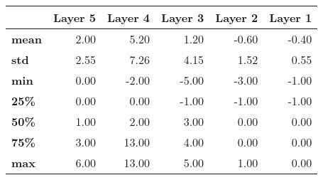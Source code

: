 \begin{tabular}{lrrrrr}
\toprule
{} &  Layer 5 &  Layer 4 &  Layer 3 &  Layer 2 &  Layer 1 \\
\midrule
\textbf{mean} &     2.00 &     5.20 &     1.20 &    -0.60 &    -0.40 \\
\textbf{std } &     2.55 &     7.26 &     4.15 &     1.52 &     0.55 \\
\textbf{min } &     0.00 &    -2.00 &    -5.00 &    -3.00 &    -1.00 \\
\textbf{25\% } &     0.00 &     0.00 &    -1.00 &    -1.00 &    -1.00 \\
\textbf{50\% } &     1.00 &     2.00 &     3.00 &     0.00 &     0.00 \\
\textbf{75\% } &     3.00 &    13.00 &     4.00 &     0.00 &     0.00 \\
\textbf{max } &     6.00 &    13.00 &     5.00 &     1.00 &     0.00 \\
\bottomrule
\end{tabular}
